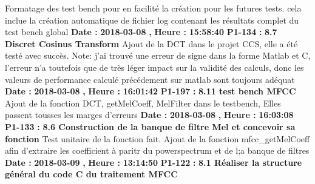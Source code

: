 \documentclass{article}%
\begin{document}
\newline%
\newline%
%
Formatage des test bench pour en facilité la création pour les futures tests. cela inclue la création automatique de fichier log contenant les résultats complet du test bench global\newline%
\newline%
%
\textbf{Date : }%
\textbf{2018{-}03{-}08}%
\textbf{,}%
\textbf{ Heure : }%
\textbf{15:58:40}%
\newline%
%
\textbf{P1{-}134 }%
\textbf{ : }%
\textbf{ 8.7 Discret Cosinus Transform}%
\newline%
\newline%
%
Ajout de la DCT dans le projet CCS, elle a été testé avec succès. \newline%
Note: j'ai trouvé une erreur de signe dans la forme Matlab et C, l'erreur n'a toutefois que de très léger impact sur la validité des calculs, donc les valeurs de performance calculé précédement sur matlab sont toujours adéquat\newline%
~\newline%
\newline%
%
\textbf{Date : }%
\textbf{2018{-}03{-}08}%
\textbf{,}%
\textbf{ Heure : }%
\textbf{16:01:42}%
\newline%
%
\textbf{P1{-}197 }%
\textbf{ : }%
\textbf{ 8.11 test bench MFCC}%
\newline%
\newline%
%
Ajout de la fonction DCT, getMelCoeff, MelFilter dans le testbench,\newline%
Elles passent tousses les marges d'erreurs\newline%
\newline%
%
\textbf{Date : }%
\textbf{2018{-}03{-}08}%
\textbf{,}%
\textbf{ Heure : }%
\textbf{16:03:08}%
\newline%
%
\textbf{P1{-}133 }%
\textbf{ : }%
\textbf{ 8.6 Construction de la banque de filtre Mel et concevoir sa fonction}%
\newline%
\newline%
%
Test unitaire de la fonction fait. Ajout de la fonction mfcc\_getMelCoeff afin d'extraire les coefficient à paritr du powerspectrum et de l;a banque de filtres\newline%
\newline%
%
\textbf{Date : }%
\textbf{2018{-}03{-}09}%
\textbf{,}%
\textbf{ Heure : }%
\textbf{13:14:50}%
\newline%
%
\textbf{P1{-}122 }%
\textbf{ : }%
\textbf{ 8.1 Réaliser la structure général du code C du traitement MFCC}%
\end{document}
